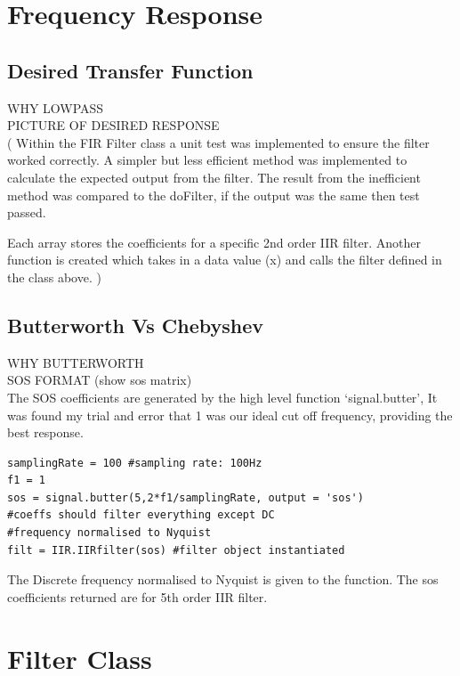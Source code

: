 \documentclass{article}
\begin{document}
\section{Frequency Response}
\subsection{Desired Transfer Function}
WHY LOWPASS\\
PICTURE OF DESIRED RESPONSE\\

(
Within the FIR Filter class a unit test was implemented to ensure the filter worked correctly. A simpler but less efficient method was implemented to calculate the expected output from the filter. The result from the inefficient method was compared to the doFilter, if the output was the same then test passed.

Each array stores the coefficients for a specific 2nd order IIR filter. Another function is created which takes in a data value (x) and calls the filter defined in the class above.
)

\subsection{Butterworth Vs Chebyshev}
WHY BUTTERWORTH\\
SOS FORMAT (show sos matrix)\\

The SOS coefficients are generated by the high level function `signal.butter', It was found my trial and error that 1 was our ideal cut off frequency, providing the best response.
\lstset{language=Python}
\begin{lstlisting}
samplingRate = 100 #sampling rate: 100Hz
f1 = 1
sos = signal.butter(5,2*f1/samplingRate, output = 'sos')
#coeffs should filter everything except DC
#frequency normalised to Nyquist
filt = IIR.IIRfilter(sos) #filter object instantiated
\end{lstlisting}
The Discrete frequency normalised to Nyquist is given to the function. The sos coefficients returned are for 5th order IIR filter. 

\section{Filter Class}
\end{document}
